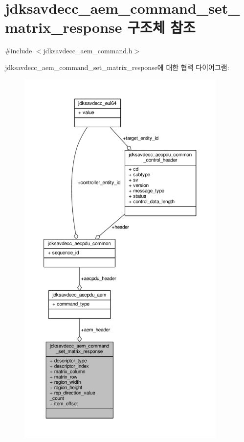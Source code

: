 \hypertarget{structjdksavdecc__aem__command__set__matrix__response}{}\section{jdksavdecc\+\_\+aem\+\_\+command\+\_\+set\+\_\+matrix\+\_\+response 구조체 참조}
\label{structjdksavdecc__aem__command__set__matrix__response}


{\ttfamily \#include $<$jdksavdecc\+\_\+aem\+\_\+command.\+h$>$}



jdksavdecc\+\_\+aem\+\_\+command\+\_\+set\+\_\+matrix\+\_\+response에 대한 협력 다이어그램\+:
\nopagebreak
\begin{figure}[H]
\begin{center}
\leavevmode
\includegraphics[height=550pt]{structjdksavdecc__aem__command__set__matrix__response__coll__graph}
\end{center}
\end{figure}

